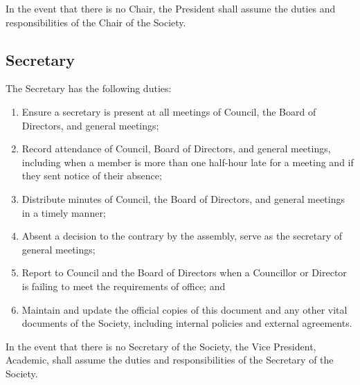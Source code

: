 In the event that there is no Chair, the President shall assume the duties and
responsibilities of the Chair of the Society. 

\subsection{Secretary}
The Secretary has the following duties:
\begin{enumerate}
    \item Ensure a secretary is present at all meetings of Council,
        the Board of Directors, and general meetings;
    \item Record attendance of Council, Board of Directors, and
        general meetings, including when a member is more than one half-hour
        late for a meeting and if they sent notice of their absence;
    \item Distribute minutes of Council, the Board of Directors, and 
        general meetings in a timely manner;
    \item Absent a decision to the contrary by the assembly, serve as the
        secretary of general meetings;
    \item Report to Council and the Board of Directors when a Councillor
        or Director is failing to meet the requirements of office; and
    \item Maintain and update the official copies of this document and any other
        vital documents of the Society, including internal policies and external
        agreements.
\end{enumerate}

In the event that there is no Secretary of the Society, the Vice President,
Academic, shall assume the duties and responsibilities of the Secretary of the
Society.
